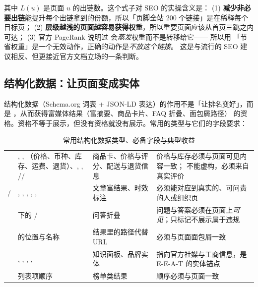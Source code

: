其中 $L(u)$ 是页面 $u$ 的出链数。这个式子对 SEO 的实操含义是：
(1) \textbf{减少非必要出链}能提升每个出链拿到的份额，所以「页脚全站 200 个链接」是在稀释每个目标页；
(2) \textbf{层级越浅的页面越容易获得权重}，所以重要页面应该从首页三跳之内可达；
(3) 官方 PageRank 说明过 会\emph{蒸发}权重而不是转移给它——
所以用  「节省权重」是一个无效动作，正确的动作是\emph{不放这个链接}。
这是与流行的 SEO 建议相反、但更接近官方文档立场的一条判断。

\subsection{结构化数据：让页面变成实体}

结构化数据（Schema.org 词表 + JSON-LD 表达）的作用不是「让排名变好」，而是
，从而获得富媒体结果（富摘要、商品卡片、FAQ 折叠、面包屑路径）
的资格。资格不等于展示，但没有资格就没有展示。常用的类型与它们的字段要求：

\begin{table}[htbp]
\centering
\caption{常用结构化数据类型、必备字段与典型收益}
\label{tab:schema}
\small
\begin{tabularx}{\textwidth}{L{2.3cm} L{3.6cm} L{2.7cm} Y}
\toprule
{} &  &  &  \\
\midrule
{} & , , （价格、币种、库存、运费、退货）、, , // & 商品卡、价格与评分、配送与退货信息 & 价格与库存必须与页面可见内容一致； 不能虚构，必须来自真实评价 \\
 /  & , , , , ,  & 文章富结果、时效标注 &  必须能对应到真实的、可问责的人或组织页 \\
 &  下的  /  & 问答折叠 & 问题与答案必须在页面上\emph{可见}；只标记不展示属于违规 \\
 &  的位置与名称 & 结果里的路径代替 URL & 必须与页面面包屑一致 \\
 & , , , ,  & 知识面板、品牌实体 &  指向官方社媒与工商信息，是 E-E-A-T 的实体锚点 \\
 & 列表项顺序 & 榜单类结果 & 顺序必须与页面一致 \\
\bottomrule
\end{tabularx}
\end{table}

